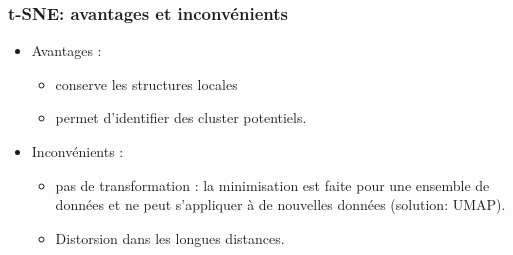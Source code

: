 \begin{frame}
\frametitle{t-SNE: avantages et inconvénients}
  \begin{itemize}
  	\item Avantages : 
  	\begin{itemize}
  		\item conserve les structures locales
  		\item permet d'identifier des cluster potentiels. 
  	\end{itemize}
  	\item Inconvénients : 
  	\begin{itemize}
  		\item pas de transformation : la minimisation est faite pour une ensemble de données et ne peut s'appliquer à de nouvelles données (solution: UMAP). 
  		\item Distorsion dans les longues distances. 
  	\end{itemize}
  \end{itemize}
\end{frame}



				



